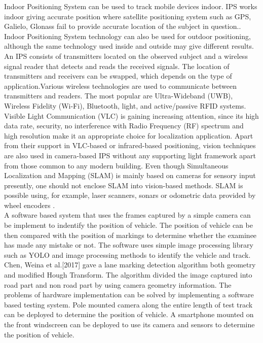 Indoor Positioning System can be used to track mobile devices indoor. IPS works indoor giving accurate position where satellite positioning system such as GPS, Galielo, Glonass fail to provide accurate location of the subject in question.\cite{indoor}. Indoor Positioning System technology can also be used for outdoor positioning, although the same technology used inside and outside may give different results\cite{localization}. An IPS consists of transmitters located on the observed subject and a wireless signal reader that detects and reads the received signals. The location of transmitters and receivers can be swapped, which depends on the type of application\cite{indoor}.Various wireless technologies are used to communicate between transmitters and readers. The most popular are Ultra-Wideband (UWB), Wireless Fidelity (Wi-Fi), Bluetooth, light, and active/passive RFID systems\cite{MRIPS}. Visible Light Communication (VLC) is gaining increasing attention, since its high data rate, security, no interference with Radio Frequency (RF) spectrum and high resolution \cite{visiblelightcomm} make it an appropriate choice for localization application. Apart from their support in VLC-based or infrared-based positioning, vision techniques are also used in camera-based IPS without any supporting light framework apart from those common to any modern building\cite{MRIPS}. Even though Simultaneous Localization and Mapping (SLAM) is mainly based on cameras for sensory input presently, one should not enclose SLAM into vision-based methods. SLAM is possible using, for example, laser scanners, sonars or odometric data provided by wheel encoders \cite{pastpresentandfutureofsimlocmap}.
\\
A software based system that uses the frames captured by a simple camera can be implement to indentify the position of vehicle. The position of vehicle can be then compared with the position of markings to determine whether the examinee has made any mistake or not. The software uses simple image processing library such as YOLO and image processing methods to identify the vehicle and track. 
Chen, Weina et al.[2017] \cite{chen} gave a lane marking detection algorithm both geometry and modified Hough Transform. The algorithm divided the image captured into road part and non road part by using camera geometry information. 
The problems of hardware implementation can be solved by implementing a software based testing system. Pole mounted camera along the entire length of test track can be deployed to determine the position of vehicle. A smartphone mounted on the front windscreen can be deployed to use its camera and sensors to determine the position of vehicle.
